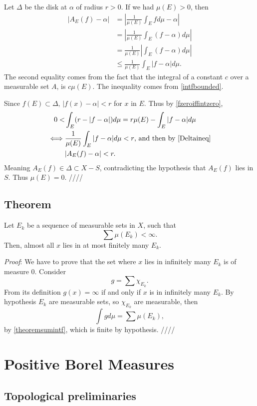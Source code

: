 \documentclass[oneside]{book}
\begin{document}
Let $\Delta$ be the disk at $\alpha$ of radius $r> 0$.
If we had $\mu(E)> 0$, then
\begin{align}
    |A_E(f)-\alpha|
    &=\left|\frac{1}{\mu(E)}\int_E fd\mu - \alpha\right|\\
    &=\left|\frac{1}{\mu(E)}\int_E (f -\alpha) d\mu\right|\\
    &=\frac{1}{\mu(E)}\left|\int_E (f - \alpha) d\mu\right|\\
    &\leq \frac{1}{\mu(E)}\int_E |f - \alpha| d\mu.\label{Deltaineq}
\end{align}
The second equality comes from the fact that the
integral of a constant $c$ over a measurable set $A$,
is $c\mu(E)$. The inequality comes from \ref{intfbounded}.

Since $f(E)\subset\Delta$, $|f(x)-\alpha|< r$ for $x$ in $E$.
Thus by \ref{fzeroiffintzero},
\begin{align*}
    0 <& \int_E(r - |f-\alpha|)d\mu = r\mu(E) -\int_E|f-\alpha|d\mu\\
    \iff& \frac{1}{\mu(E)}\int_E |f - \alpha| d\mu < r\text{, and then by \ref{Deltaineq}}\\
    &|A_E(f)-\alpha| < r.
\end{align*}
Meaning $A_E(f)\in \Delta \subset X-S$, 
contradicting the hypothesis that $A_E(f)$ lies in $S$.
Thus $\mu(E) = 0$.
\hfill ////

\section{Theorem}
Let $E_k$ be a sequence of measurable sets in $X$, such
that
\begin{equation}\label{summuek}
    \sum\mu(E_k) <\infty.
\end{equation}
Then, almost all $x$ lies in at most finitely many $E_k$.

\emph{Proof}: We have to prove that the set where $x$ lies
in infinitely many $E_k$ is of measure $0$.
Consider
$$g=\sum\chi_{E_k}.$$
From its definition $g(x) = \infty$ if and only if $x$
is in infinitely many $E_k$.
By hypothesis $E_k$ are measurable sets, so $\chi_{E_k}$
are measurable,
then 
$$\int gd\mu = \sum\mu(E_k),$$
by \ref{theoremsumintf},
which is finite by hypothesis. \hfill ////

\chapter{Positive Borel Measures}
\section{Topological preliminaries}
\end{document}
